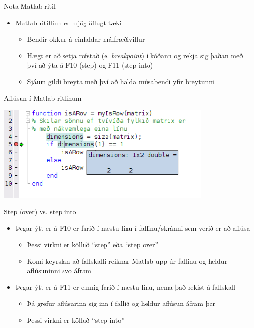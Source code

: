 \documentclass{beamer}
\begin{document}
\begin{frame}{Nota Matlab ritil}
\begin{itemize}
 \item Matlab ritillinn er mjög öflugt tæki
 \begin{itemize}
  \item Bendir okkur á einfaldar málfræðivillur
  \item Hægt er að setja rofstað (e. \emph{breakpoint}) í kóðann og rekja sig þaðan með því að ýta á F10 (step) og F11 (step into)
  \item Sjáum gildi breyta með því að halda músabendi yfir breytunni
 \end{itemize}
\end{itemize}
\end{frame}

\begin{frame}{Aflúsun í Matlab ritlinum}
\begin{center}
\includegraphics[width=0.8\textwidth]{Pics/debugging}
\end{center}
\end{frame}

\begin{frame}{Step (over) vs. step into}
\begin{itemize}
 \item Þegar ýtt er á F10 er farið í næstu línu í fallinu/skránni sem verið er að aflúsa
 \begin{itemize}
  \item Þessi virkni er kölluð ``step'' eða ``step over''
  \item Komi keyrslan að fallskalli reiknar Matlab upp úr fallinu og heldur aflúsuninni svo áfram
 \end{itemize}
 \item Þegar ýtt er á F11 er einnig farið í næstu línu, nema það rekist á fallskall
 \begin{itemize}
  \item Þá grefur aflúsarinn sig inn í fallið og heldur aflúsun áfram þar
  \item Þessi virkni er kölluð ``step into'' 
 \end{itemize}
\end{itemize}
\end{frame}
\end{document}
